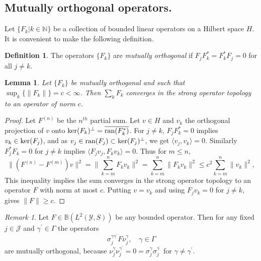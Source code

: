 \documentclass[11pt,reqno]{amsart}
\newtheorem{lemma}[theorem]{Lemma}
\theoremstyle{definition}
\newtheorem{definition}[theorem]{Definition}
\theoremstyle{remark}
\newtheorem{remark}[theorem]{Remark}
\newcommand{\pair}[2]{\langle #1, #2 \rangle}
\def\Y{\ensuremath{\mathcal{Y}}}
\def\J{\ensuremath{\mathcal{J}}}
\def\bN{\ensuremath{\mathbb{N}}}
\def\bB{\ensuremath{\mathbb{B}}}
\def\ran{\ensuremath{\textnormal{ran}}}
\def\ker{\ensuremath{\textnormal{ker}}}
\begin{document}
\subsection{Mutually orthogonal operators.}
Let $\{F_k|k \in \bN\}$ be a collection of bounded linear operators on a Hilbert space $H$.  It is convenient to make the following definition.
\begin{definition}
The operators $\{F_k\}$ are \emph{mutually orthogonal} if $F_jF_k^\ast=F_k^\ast F_j=0$ for all $j \ne k$.
\end{definition}
\begin{lemma}
\label{lem:orthogonal}
Let $\{F_k\}$ be mutually orthogonal and such that $\sup_k \{\|F_k\|\}=c<\infty$.  Then $\sum_k F_k$ converges in the strong operator topology to an operator of norm $c$.
\end{lemma}
\begin{proof}
Let $F^{(n)}$ be the $n^{th}$ partial sum.  Let $v \in H$ and $v_k$ the orthogonal projection of $v$ onto $\ker(F_k)^\perp=\overline{\ran(F_k^\ast)}$.  For $j \ne k$, $F_jF_k^\ast=0$ implies $v_k \in \ker(F_j)$, and as $v_j \in \ran(F_j) \subset \ker(F_j)^\perp$, we get $\pair{v_j}{v_k}=0$.  Similarly $F_j^\ast F_k=0$ for $j \ne k$ implies $\pair{F_jv_j}{F_kv_k}=0$.  Thus for $m\le n$,
\[ \|(F^{(n)}-F^{(m)})v\|^2=\bigg\|\sum_{k=m}^n F_kv_k\bigg\|^2=\sum_{k=m}^n \|F_kv_k\|^2\le c^2\sum_{k=m}^n\|v_k\|^2,\]
This inequality implies the sum converges in the strong operator topology to an operator $F$ with norm at most $c$.  Putting $v=v_k$ and using $F_jv_k=0$ for $j \ne k$, gives $\|F\| \ge c$.
\end{proof}
\begin{remark}
\label{rem:mutuallyorthogonal}
Let $F \in \bB(L^2(\Y,S))$ be any bounded operator.  Then for any fixed $j \in \J$ and $\gamma^\prime \in \Gamma$ the operators
\[ \sigma_j^{\gamma \gamma^\prime} F \nu_j^{\gamma}, \quad \gamma \in \Gamma\]
are mutually orthogonal, because $\nu_j^{\gamma} \nu_j^{\gamma^\prime}=0=\sigma_j^{\gamma}\sigma_j^{\gamma^\prime}$ for $\gamma \ne \gamma^\prime$.
\end{remark}
\end{document}
